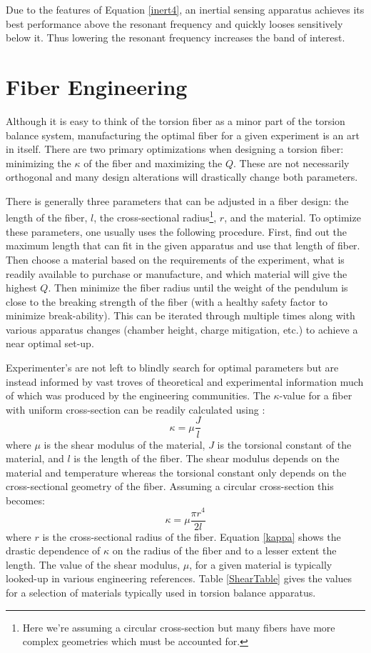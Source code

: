 \documentclass{book}
\begin{document}
Due to the features of Equation \ref{inert4}, an inertial sensing apparatus achieves its best performance above the resonant frequency and quickly looses sensitively below it. Thus lowering the resonant frequency increases the band of interest.

\section{Fiber Engineering} \label{fiber}

\quad Although it is easy to think of the torsion fiber as a minor part of the torsion balance system, manufacturing the optimal fiber for a given experiment is an art in itself. There are two primary optimizations when designing a torsion fiber: minimizing the $\kappa$ of the fiber and maximizing the $Q$. These are not necessarily orthogonal and many design alterations will drastically change both parameters. 

There is generally three parameters that can be adjusted in a fiber design: the length of the fiber, $l$, the cross-sectional radius\footnote{Here we're assuming a circular cross-section but many fibers have more complex geometries which must be accounted for.}, $r$, and the material. To optimize these parameters, one usually uses the following procedure. First, find out the maximum length that can fit in the given apparatus and use that length of fiber. Then choose a material based on the requirements of the experiment, what is readily available to purchase or manufacture, and which material will give the highest $Q$. Then minimize the fiber radius until the weight of the pendulum is close to the breaking strength of the fiber (with a healthy safety factor to minimize break-ability). This can be iterated through multiple times along with various apparatus changes (chamber height, charge mitigation, etc.) to achieve a near optimal set-up. 

Experimenter's are not left to blindly search for optimal parameters but are instead informed by vast troves of theoretical and experimental information much of which was produced by the engineering communities. The $\kappa$-value for a fiber with uniform cross-section can be readily calculated using \cite{hibbeler2003mechanics}:
\begin{equation}
\kappa = \mu \frac{J}{l} 
\end{equation}
where $\mu$ is the shear modulus of the material, $J$ is the torsional constant of the material, and $l$ is the length of the fiber. The shear modulus depends on the material and temperature whereas the torsional constant only depends on the cross-sectional geometry of the fiber. Assuming a circular cross-section this becomes:
\begin{equation}
\kappa = \mu \frac{\pi r^4}{2 l} \label{kappa}
\end{equation}
where $r$ is the cross-sectional radius of the fiber. Equation \ref{kappa} shows the drastic dependence of $\kappa$ on the radius of the fiber and to a lesser extent the length. The value of the shear modulus, $\mu$, for a given material is typically looked-up in various engineering references. Table \ref{ShearTable} gives the values for a selection of materials typically used in torsion balance apparatus.
\end{document}
